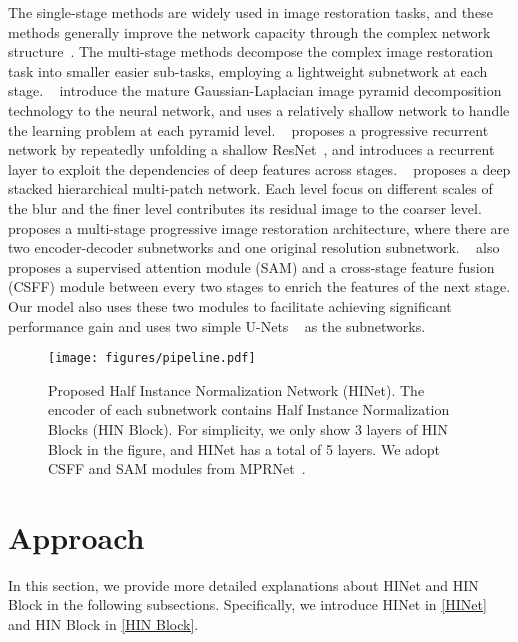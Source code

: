 \documentclass[final]{cvpr}
\begin{document}
The single-stage methods are widely used in image restoration tasks, and these methods generally improve the network capacity through the complex network structure~\cite{anwar2020densely, zhang2018density}. The multi-stage methods decompose the complex image restoration task into smaller easier sub-tasks, employing a lightweight subnetwork at each stage. ~\cite{fu2019lightweight} introduce the mature Gaussian-Laplacian image pyramid decomposition technology to the neural network, and uses a relatively shallow network to handle the learning problem at each pyramid level. ~\cite{ren2019progressive} proposes a progressive recurrent network by repeatedly unfolding a shallow ResNet~\cite{he2016deep}, and introduces a recurrent layer to exploit the dependencies of deep features across stages. ~\cite{zhang2019deep} proposes a deep stacked hierarchical multi-patch network. Each level focus on different scales of the blur and the finer level contributes its residual image to the coarser level. ~\cite{zamir2021multi} proposes a multi-stage progressive image restoration architecture, where there are two encoder-decoder subnetworks and one original resolution subnetwork. ~\cite{zamir2021multi} also proposes a supervised attention module (SAM) and a cross-stage feature fusion (CSFF) module between every two stages to enrich the features of the next stage. Our model also uses these two modules to facilitate achieving significant performance gain and uses two simple U-Nets ~\cite{ronneberger2015u} as the subnetworks.



\begin{figure*}
    \centering
    \texttt{[image: figures/pipeline.pdf]}
    \caption{Proposed Half Instance Normalization Network (HINet). The encoder of each subnetwork contains Half Instance Normalization Blocks (HIN Block). For simplicity, we only show 3 layers of HIN Block in the figure, and HINet has a total of 5 layers. We adopt CSFF and SAM modules from MPRNet~\cite{Zamir2021MPRNet}.}
    \label{fig:pipeline}
    \vspace{-0.2cm}
\end{figure*}

\section{Approach}
In this section, we provide more detailed explanations about HINet and HIN Block in the following subsections. Specifically, we introduce HINet in \ref{HINet} and HIN Block in \ref{HIN Block}.
\end{document}
